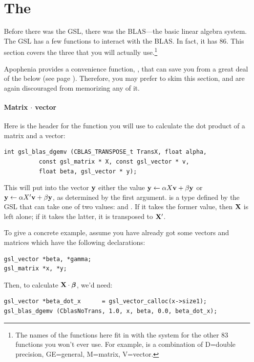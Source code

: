 \section{The } 
 
Before there was the GSL, there was the BLAS---the basic linear algebra
system. The GSL has a few functions to interact with the BLAS. In fact,
it has 86. This section covers the three that you will actually 
use.\footnote{The names of the functions here fit in with the system
for the other 83 functions you won't ever use. For example,
 is a combination
of D=double precision, GE=general, M=matrix, V=vector.}

Apophenia provides a convenience function, , that can
save you from a great deal of the below (see page \pageref{apopdot}).
Therefore, you may prefer to skim this section, and are again
discouraged from memorizing any of it.

\paragraph{Matrix $\cdot$ vector} Here is the header for the function you will use to calculate the dot product of a
matrix and a vector:
\begin{lstlisting}
int gsl_blas_dgemv (CBLAS_TRANSPOSE_t TransX, float alpha, 
          const gsl_matrix * X, const gsl_vector * v, 
          float beta, gsl_vector * y);
\end{lstlisting}

This will put into the vector ${\bf y}$ either the value 
${\bf y} \leftarrow \alpha X {\bf v} + \beta {\bf y}$ or ${\bf y} \leftarrow \alpha X' {\bf v} + \beta {\bf y}$, as determined by the
first argument.
 is a type defined by the GSL that can take
one of two values:  and . If
it takes the former value, then ${\bf X}$ is left alone;
if it takes the latter, it is transposed to ${\bf X}'$.

To give a concrete example, assume you have already got some vectors and matrices which have the following
declarations:
\begin{lstlisting}
gsl_vector *beta, *gamma;     
gsl_matrix *x, *y;           
\end{lstlisting}

Then, to calculate ${\bf X}\cdot {\mbox{\boldmath$\beta$}}$, we'd need:

\begin{lstlisting}
gsl_vector *beta_dot_x      = gsl_vector_calloc(x->size1);
gsl_blas_dgemv (CblasNoTrans, 1.0, x, beta, 0.0, beta_dot_x);
\end{lstlisting}

